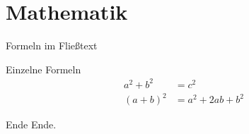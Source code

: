\documentclass[t, aspectratio=169, ngerman]{beamer}
\begin{document}
	\section{Mathematik}

	\begin{frame}{Formeln im Fließtext}
		\blindmathtrue
		\Blindtext[1][5]
		\blindmathfalse
	\end{frame}

	\begin{frame}{Einzelne Formeln}
		\begin{align}
			a^2 + b^2 &= c^2\\
			(a+b)^2 &= a^2 + 2ab + b^2
		\end{align}
	\end{frame}

	\begin{frame}[plain]{Ende}
		\Huge{Ende.}
	\end{frame}
\end{document}
